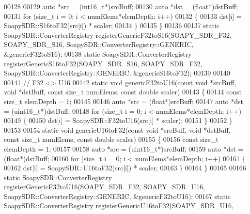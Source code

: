 \begin{DoxyCode}
00128 
00129   \textcolor{keyword}{auto} *src = (int16\_t*)srcBuff;
00130   \textcolor{keyword}{auto} *dst = (\textcolor{keywordtype}{float}*)dstBuff;
00131   \textcolor{keywordflow}{for} (\textcolor{keywordtype}{size\_t} i = 0; i < numElems*elemDepth; i++)
00132     \{
00133       dst[i] = SoapySDR::S16toF32(src[i]) * scaler;
00134     \}
00135 \}
00136 
00137 \textcolor{keyword}{static} SoapySDR::ConverterRegistry registerGenericF32toS16(SOAPY_SDR_F32, 
      SOAPY_SDR_S16, SoapySDR::ConverterRegistry::GENERIC, &genericF32toS16);
00138 \textcolor{keyword}{static} SoapySDR::ConverterRegistry registerGenericS16toF32(SOAPY_SDR_S16, 
      SOAPY_SDR_F32, SoapySDR::ConverterRegistry::GENERIC, &genericS16toF32);
00139 
00140 
00141 \textcolor{comment}{// F32 <> U16}
00142 \textcolor{keyword}{static} \textcolor{keywordtype}{void} genericF32toU16(\textcolor{keyword}{const} \textcolor{keywordtype}{void} *srcBuff, \textcolor{keywordtype}{void} *dstBuff, \textcolor{keyword}{const} \textcolor{keywordtype}{size\_t} numElems, \textcolor{keyword}{const} \textcolor{keywordtype}{double} scaler)
00143 \{
00144   \textcolor{keyword}{const} \textcolor{keywordtype}{size\_t} elemDepth = 1;
00145 
00146   \textcolor{keyword}{auto} *src = (\textcolor{keywordtype}{float}*)srcBuff;
00147   \textcolor{keyword}{auto} *dst = (uint16\_t*)dstBuff;
00148   \textcolor{keywordflow}{for} (\textcolor{keywordtype}{size\_t} i = 0; i < numElems*elemDepth; i++)
00149     \{
00150       dst[i] = SoapySDR::F32toU16(src[i] * scaler);
00151     \}
00152 \}
00153 
00154 \textcolor{keyword}{static} \textcolor{keywordtype}{void} genericU16toF32(\textcolor{keyword}{const} \textcolor{keywordtype}{void} *srcBuff, \textcolor{keywordtype}{void} *dstBuff, \textcolor{keyword}{const} \textcolor{keywordtype}{size\_t} numElems, \textcolor{keyword}{const} \textcolor{keywordtype}{double} scaler)
00155 \{
00156   \textcolor{keyword}{const} \textcolor{keywordtype}{size\_t} elemDepth = 1;
00157 
00158   \textcolor{keyword}{auto} *src = (uint16\_t*)srcBuff;
00159   \textcolor{keyword}{auto} *dst = (\textcolor{keywordtype}{float}*)dstBuff;
00160   \textcolor{keywordflow}{for} (\textcolor{keywordtype}{size\_t} i = 0; i < numElems*elemDepth; i++)
00161     \{
00162       dst[i] = SoapySDR::U16toF32(src[i]) * scaler;
00163     \}
00164 \}
00165 
00166 \textcolor{keyword}{static} SoapySDR::ConverterRegistry registerGenericF32toU16(SOAPY_SDR_F32, 
      SOAPY_SDR_U16, SoapySDR::ConverterRegistry::GENERIC, &genericF32toU16);
00167 \textcolor{keyword}{static} SoapySDR::ConverterRegistry registerGenericU16toF32(SOAPY_SDR_U16, 

\end{DoxyCode}
